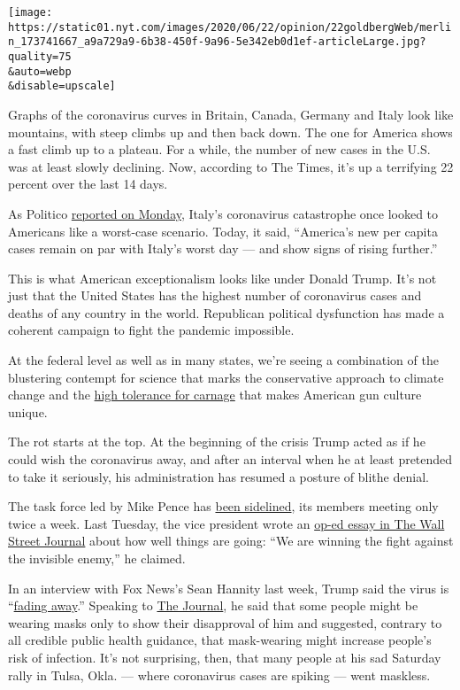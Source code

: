 \texttt{[image: https://static01.nyt.com/images/2020/06/22/opinion/22goldbergWeb/merlin\_173741667\_a9a729a9-6b38-450f-9a96-5e342eb0d1ef-articleLarge.jpg?quality=75\\\&auto=webp\\\&disable=upscale]}

Graphs of the coronavirus curves in Britain, Canada, Germany and Italy
look like mountains, with steep climbs up and then back down. The one
for America shows a fast climb up to a plateau. For a while, the number
of new cases in the U.S. was at least slowly declining. Now, according
to The Times, it's up a terrifying 22 percent over the last 14 days.

As Politico
\href{https://www.politico.com/news/2020/06/22/united-states-italy-traded-places-coronavirus-333122}{reported
on Monday}, Italy's coronavirus catastrophe once looked to Americans
like a worst-case scenario. Today, it said, ``America's new per capita
cases remain on par with Italy's worst day --- and show signs of rising
further.''

This is what American exceptionalism looks like under Donald Trump. It's
not just that the United States has the highest number of coronavirus
cases and deaths of any country in the world. Republican political
dysfunction has made a coherent campaign to fight the pandemic
impossible.

At the federal level as well as in many states, we're seeing a
combination of the blustering contempt for science that marks the
conservative approach to climate change and the
\href{https://www.nytimes.com/2020/05/05/opinion/coronavirus-deaths.html}{high
tolerance for carnage} that makes American gun culture unique.

The rot starts at the top. At the beginning of the crisis Trump acted as
if he could wish the coronavirus away, and after an interval when he at
least pretended to take it seriously, his administration has resumed a
posture of blithe denial.

The task force led by Mike Pence has
\href{https://www.cnn.com/2020/05/28/politics/donald-trump-coronavirus-task-force/index.html}{been
sidelined}, its members meeting only twice a week. Last Tuesday, the
vice president wrote an
\href{https://www.wsj.com/articles/there-isnt-a-coronavirus-second-wave-11592327890}{op-ed
essay in The Wall Street Journal} about how well things are going: ``We
are winning the fight against the invisible enemy,'' he claimed.

In an interview with Fox News's Sean Hannity last week, Trump said the
virus is
``\href{https://www.foxnews.com/media/trump-hannity-coronavirus-fading-away-tulsa-rally}{fading
away}.'' Speaking to
\href{https://www.wsj.com/articles/trump-talks-juneteenth-john-bolton-economy-in-wsj-interview-11592493771}{The
Journal}, he said that some people might be wearing masks only to show
their disapproval of him and suggested, contrary to all credible public
health guidance, that mask-wearing might increase people's risk of
infection. It's not surprising, then, that many people at his sad
Saturday rally in Tulsa, Okla. --- where coronavirus cases are spiking
--- went maskless.

